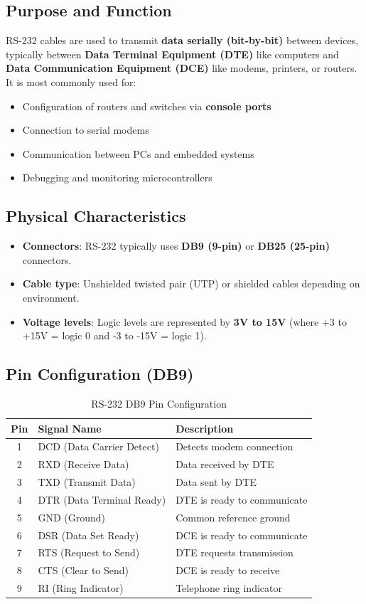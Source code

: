 \documentclass[12pt]{article}
\begin{document}
\subsection{Purpose and Function}
RS-232 cables are used to transmit \textbf{data serially (bit-by-bit)} between devices, typically between \textbf{Data Terminal Equipment (DTE)} like computers and \textbf{Data Communication Equipment (DCE)} like modems, printers, or routers. It is most commonly used for:
\begin{itemize}
  \item Configuration of routers and switches via \textbf{console ports}
  \item Connection to serial modems
  \item Communication between PCs and embedded systems
  \item Debugging and monitoring microcontrollers
\end{itemize}

\subsection{Physical Characteristics}
\begin{itemize}
  \item \textbf{Connectors}: RS-232 typically uses \textbf{DB9 (9-pin)} or \textbf{DB25 (25-pin)} connectors.
  \item \textbf{Cable type}: Unshielded twisted pair (UTP) or shielded cables depending on environment.
  \item \textbf{Voltage levels}: Logic levels are represented by \textbf{\textpm3V to \textpm15V} (where +3 to +15V = logic 0 and -3 to -15V = logic 1).
\end{itemize}

\subsection{Pin Configuration (DB9)}
\begin{table}[h!]
\centering
\begin{tabular}{|c|l|l|}
\hline
\textbf{Pin} & \textbf{Signal Name} & \textbf{Description} \\
\hline
1 & DCD (Data Carrier Detect) & Detects modem connection \\
2 & RXD (Receive Data) & Data received by DTE \\
3 & TXD (Transmit Data) & Data sent by DTE \\
4 & DTR (Data Terminal Ready) & DTE is ready to communicate \\
5 & GND (Ground) & Common reference ground \\
6 & DSR (Data Set Ready) & DCE is ready to communicate \\
7 & RTS (Request to Send) & DTE requests transmission \\
8 & CTS (Clear to Send) & DCE is ready to receive \\
9 & RI (Ring Indicator) & Telephone ring indicator \\
\hline
\end{tabular}
\caption{RS-232 DB9 Pin Configuration}
\end{table}
\end{document}
